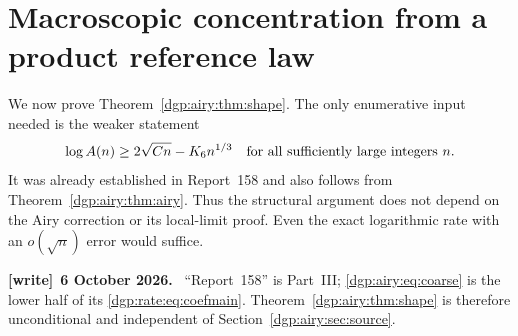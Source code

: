\documentclass[11pt,letterpaper]{article}
\numberwithin{equation}{section}
\theoremstyle{remark}\newtheorem{remark}[theorem]{Remark}
\newenvironment{writenote}[1][]{\par\smallskip\begingroup\small
 \noindent\textbf{[write]}\if\relax\detokenize{#1}\relax\else~\textbf{#1.}\fi\ }%
 {\par\endgroup\smallskip}
\begin{document}
\section{Macroscopic concentration from a product reference law}\label{dgp:airy:sec:shapeproof}
We now prove Theorem~\ref{dgp:airy:thm:shape}. The only enumerative input
needed is the weaker statement
\begin{equation}\label{dgp:airy:eq:coarse}
 \log A(n)\geq2\sqrt{Cn}-K_6n^{1/3}
 \quad\hbox{for all sufficiently large integers }n.
\end{equation}
It was already established in Report~158 and also follows from
Theorem~\ref{dgp:airy:thm:airy}. Thus the structural argument does not depend
on the Airy correction or its local-limit proof. Even the exact
logarithmic rate with an $o(\sqrt n)$ error would suffice.
\begin{writenote}[6 October 2026]
``Report~158'' is Part~III; \eqref{dgp:airy:eq:coarse} is the lower half of its \eqref{dgp:rate:eq:coefmain}. Theorem~\ref{dgp:airy:thm:shape} is therefore unconditional and independent of Section~\ref{dgp:airy:sec:source}.
\end{writenote}
\end{document}
